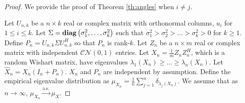 \begin{proof}
We provide the proof of Theorem \ref{th:angles} when $i\neq j$.

Let $U_{n,k}$ be a $n\times k$ real or complex matrix with orthonormal columns, $u_i$ for $1\leq i\leq k$. Let $\Sigma = \mathop{\bf diag}\left(\sigma_1^2,\dots,\sigma_k^2\right)$ such that $\sigma_1^2>\sigma_2^2>\dots>\sigma_k^2>0$ for $k\geq 1$. Define $P_n=U_{n,k}\Sigma U_{n,k}^H$ so that $P_n$ is rank-$k$. Let $Z_n$ be a $n\times m$ real or complex matrix with independent $\mathcal{CN}\left(0,1\right)$ entries. Let $X_n=\frac{1}{m}Z_nZ_n^H$, which is a random Wishart matrix, have eigenvalues $\lambda_1\left(X_n\right)\geq\dots\geq\lambda_n\left(X_n\right)$. Let $\widehat{X}_n=X_n\left(I_n+P_n\right)$. $X_n$ and $P_n$ are independent by assumption. Define the empirical eigenvalue distribution as $\mu_{X_n}=\frac{1}{n}\sum_{j=1}^n\delta_{\lambda_j\left(X_n\right)}$. We assume that as $n\to\infty$, $\mu_{X_n}\overset{\text{a.s.}}{\longrightarrow}\mu_X$.


\end{proof}
